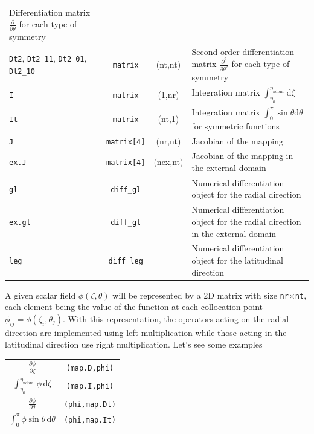 \begin{longtable}{p{3.7cm}ccp{5cm}}
Differentiation matrix $\frac{\partial}{\partial\theta}$ for each type of symmetry\\
\texttt{Dt2}, \texttt{Dt2\_11}, \texttt{Dt2\_01}, \texttt{Dt2\_10}&\texttt{matrix}&(nt,nt)&
Second order differentiation matrix $\frac{\partial^2}{\partial\theta^2}$ for each type of symmetry\\
\texttt{I}&\texttt{matrix}&(1,nr)&Integration matrix $\int_{\eta_0}^{\eta_\mathrm{ndom.}}\mathrm{d}\zeta$\\
\texttt{It}&\texttt{matrix}&(nt,1)&Integration matrix $\int_0^\pi\sin\theta\mathrm{d}\theta$ for symmetric functions\\
\texttt{J}&\texttt{matrix[4]}&(nr,nt)&Jacobian of the mapping\\
\texttt{ex.J}&\texttt{matrix[4]}&(nex,nt)&Jacobian of the mapping in the external
domain\\
\texttt{gl}&\texttt{diff\_gl}&&Numerical differentiation object for the radial direction\\
\texttt{ex.gl}&\texttt{diff\_gl}&&Numerical differentiation object for the radial direction in the
external domain\\
\texttt{leg}&\texttt{diff\_leg}&&Numerical differentiation object for the latitudinal direction\\
\end{longtable}

\renewcommand{\arraystretch}{1} 

A given scalar field $\phi(\zeta,\theta)$ will be represented by a 2D matrix with size \verb|nr|$\times$\verb|nt|,
each element being the value of the function at each collocation point $\phi_{ij}=\phi(\zeta_i,\theta_j)$.
With this representation, the operators acting on the radial direction are implemented using left multiplication
while those acting in the latitudinal direction use right multiplication. Let's see some examples

\medskip
\renewcommand{\arraystretch}{2} 
\begin{tabular}{c@{\quad:\quad}c}
$\displaystyle\frac{\partial\phi}{\partial\zeta}$&\verb|(map.D,phi)|\\
$\displaystyle\int_{\eta_0}^{\eta_\mathrm{ndom.}}\phi\,\mathrm{d}\zeta$&\verb|(map.I,phi)|\\
$\displaystyle\frac{\partial\phi}{\partial\theta}$&\verb|(phi,map.Dt)|\\
$\displaystyle\int_0^\pi\phi\sin\theta\,\mathrm{d}\theta$&\verb|(phi,map.It)|\\
\end{tabular} 
\renewcommand{\arraystretch}{1} 
\medskip

